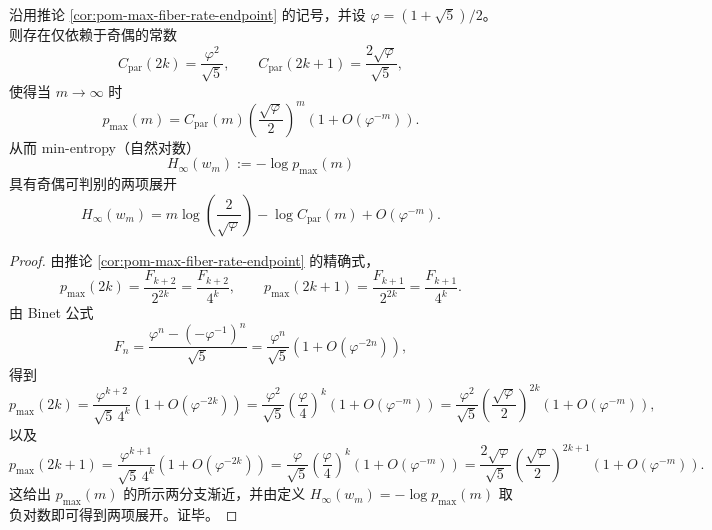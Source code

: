 \begin{proposition}\label{prop:pom-max-atomic-weight-parity-second-order}
沿用推论 \ref{cor:pom-max-fiber-rate-endpoint} 的记号，并设 \(\varphi=(1+\sqrt5)/2\)。
则存在仅依赖于奇偶的常数
\[
C_{\mathrm{par}}(2k)=\frac{\varphi^2}{\sqrt5},\qquad
C_{\mathrm{par}}(2k+1)=\frac{2\sqrt{\varphi}}{\sqrt5},
\]
使得当 \(m\to\infty\) 时
\[
p_{\max}(m)
=C_{\mathrm{par}}(m)\left(\frac{\sqrt{\varphi}}{2}\right)^m\left(1+O(\varphi^{-m})\right).
\]
从而 min-entropy（自然对数）
\[
H_\infty(w_m):=-\log p_{\max}(m)
\]
具有奇偶可判别的两项展开
\[
H_\infty(w_m)
=m\log\!\left(\frac{2}{\sqrt{\varphi}}\right)-\log C_{\mathrm{par}}(m)+O(\varphi^{-m}).
\]
\end{proposition}
\begin{proof}
由推论 \ref{cor:pom-max-fiber-rate-endpoint} 的精确式，
\[
p_{\max}(2k)=\frac{F_{k+2}}{2^{2k}}=\frac{F_{k+2}}{4^k},
\qquad
p_{\max}(2k+1)=\frac{F_{k+1}}{2^{2k}}=\frac{F_{k+1}}{4^k}.
\]
由 Binet 公式
\[
F_n=\frac{\varphi^n-(-\varphi^{-1})^n}{\sqrt5}
=\frac{\varphi^n}{\sqrt5}\left(1+O(\varphi^{-2n})\right),
\]
得到
\[
p_{\max}(2k)
=\frac{\varphi^{k+2}}{\sqrt5\,4^k}\left(1+O(\varphi^{-2k})\right)
=\frac{\varphi^2}{\sqrt5}\left(\frac{\varphi}{4}\right)^k\left(1+O(\varphi^{-m})\right)
=\frac{\varphi^2}{\sqrt5}\left(\frac{\sqrt\varphi}{2}\right)^{2k}\left(1+O(\varphi^{-m})\right),
\]
以及
\[
p_{\max}(2k+1)
=\frac{\varphi^{k+1}}{\sqrt5\,4^k}\left(1+O(\varphi^{-2k})\right)
=\frac{\varphi}{\sqrt5}\left(\frac{\varphi}{4}\right)^k\left(1+O(\varphi^{-m})\right)
=\frac{2\sqrt{\varphi}}{\sqrt5}\left(\frac{\sqrt\varphi}{2}\right)^{2k+1}\left(1+O(\varphi^{-m})\right).
\]
这给出 \(p_{\max}(m)\) 的所示两分支渐近，并由定义 \(H_\infty(w_m)=-\log p_{\max}(m)\) 取负对数即可得到两项展开。证毕。
\end{proof}

\endinput
